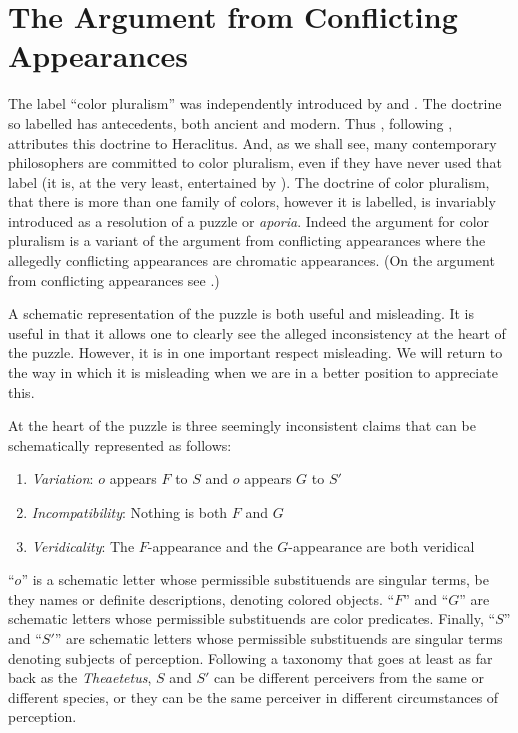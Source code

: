 \documentclass[12pt]{article}
\begin{document}
\section{The Argument from Conflicting Appearances} %
\label{sec:the_argument_from_conflicting_appearances}

The label ``color pluralism'' was independently introduced by \citet{Mizrahi:2006zr} and \citet{Kalderon:2006tg}. The doctrine so labelled has antecedents, both ancient and modern. Thus \citet{Kalderon:2006tg}, following \citet{Burnyeat:1979mv}, attributes this doctrine to Heraclitus. And, as we shall see, many contemporary philosophers are committed to color pluralism, even if they have never used that label (it is, at the very least, entertained by \citealt{Harman:2001mv}). The doctrine of color pluralism, that there is more than one family of colors, however it is labelled, is invariably introduced as a resolution of a puzzle or \emph{aporia}. Indeed the argument for color pluralism is a variant of the argument from conflicting appearances where the allegedly conflicting appearances are chromatic appearances. (On the argument from conflicting appearances see \citealt{Burnyeat:1979mv,Annas:1985fk}.)

A schematic representation of the puzzle is both useful and misleading. It is useful in that it allows one to clearly see the alleged inconsistency at the heart of the puzzle. However, it is in one important respect misleading. We will return to the way in which it is misleading when we are in a better position to appreciate this.

At the heart of the puzzle is three seemingly inconsistent claims that can be schematically represented as follows:
\begin{enumerate}
	\item \emph{Variation}: \( o \) appears \( F \) to \( S \) and \( o \) appears \( G \) to \( S' \)
	\item \emph{Incompatibility}: Nothing is both \( F \) and \( G \)
	\item \emph{Veridicality}: The \( F \)-appearance and the \( G \)-appearance are both veridical
\end{enumerate}
``\( o \)'' is a schematic letter whose permissible substituends are singular terms, be they names or definite descriptions, denoting colored objects. ``\( F \)'' and ``\( G \)'' are schematic letters whose permissible substituends are color predicates. Finally, ``\( S \)'' and ``\( S' \)'' are schematic letters whose permissible substituends are singular terms denoting subjects of perception. Following a taxonomy that goes at least as far back as the \emph{Theaetetus}, \( S \) and \( S' \) can be different perceivers from the same or different species, or they can be the same perceiver in different circumstances of perception.
\end{document}
